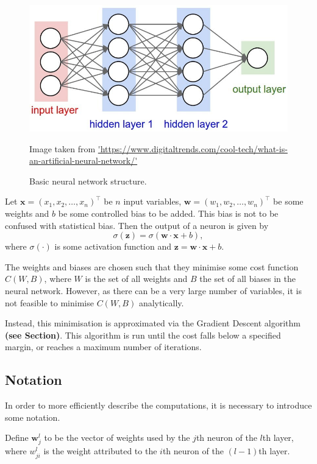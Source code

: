\documentclass[honours,12pt]{unswthesis}
\numberwithin{equation}{section}
\begin{document}
\begin{figure}[ht]
	\centering
	\includegraphics[width=\textwidth]{Images/3_nnet_structure.jpg}
	\caption{Basic neural network structure.}
	\small Image taken from \url{'https://www.digitaltrends.com/cool-tech/what-is-an-artificial-neural-network/'}
\end{figure}

Let $\mathbf{x} = (x_1, x_2, \ldots, x_n)^\top$ be $n$ input variables, $\mathbf{w} = (w_1, w_2, \ldots, w_n)^\top$ be some weights and $b$ be some controlled bias to be added. This bias is not to be confused with statistical bias. Then the output of a neuron is given by
\[
	\sigma(\mathbf z) = \sigma(\mathbf{w}\cdot\mathbf{x} + b),
\]
where $\sigma(\cdot)$ is some activation function and $\mathbf{z} = \mathbf{w}\cdot\mathbf{x} + b$.

The weights and biases are chosen such that they minimise some cost function $C(W,B)$, where $W$ is the set of all weights and $B$ the set of all biases in the neural network. However, as there can be a very large number of variables, it is not feasible to minimise $C(W,B)$ analytically.

Instead, this minimisation is approximated via the Gradient Descent algorithm \textbf{(see Section)}. This algorithm is run until the cost falls below a specified margin, or reaches a maximum number of iterations.

\subsection{Notation}\label{nnets-not}

In order to more efficiently describe the computations, it is necessary to introduce some notation.

Define $\mathbf{w}_j^l$ to be the vector of weights used by the $j$th neuron of the $l$th layer, where $w_{ji}^l$ is the weight attributed to the $i$th neuron of the $(l-1)$th layer.
\end{document}
